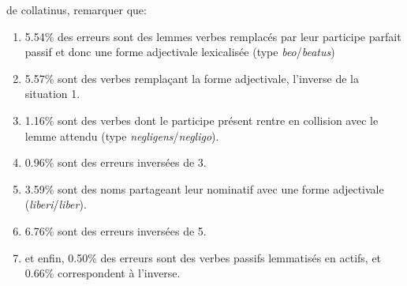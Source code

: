de collatinus, remarquer que:

\begin{enumerate}
    \item 5.54\% des erreurs sont des lemmes verbes remplacés par leur participe parfait passif et donc une forme adjectivale lexicalisée (type \textit{beo}/\textit{beatus})
    \item 5.57\% sont des verbes remplaçant la forme adjectivale, l'inverse de la situation 1.
    \item 1.16\% sont des verbes dont le participe présent rentre en collision avec le lemme attendu (type \textit{negligens}/\textit{negligo}).
    \item 0.96\% sont des erreurs inversées de 3.
    \item 3.59\% sont des noms partageant leur nominatif avec une forme adjectivale (\textit{liberi}/\textit{liber}).
    \item 6.76\% sont des erreurs inversées de 5.
    \item et enfin, 0.50\% des erreurs sont des verbes passifs lemmatisés en actifs, et 0.66\% correspondent à l'inverse.
\end{enumerate}

